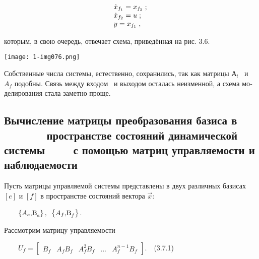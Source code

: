 \documentclass[a4paper]{article}
\newcommand\boldsubformula[1]{\text{\mathversion{bold}$#1$}}
\begin{document}
\begin{equation*}
\begin{matrix}\dot x_{f_1}=x_{f_2}\;;\hfill\null \\\dot x_{f_2}=u\;;\hfill\null \\y=x_{f_1}\;,\hfill\null
\end{matrix}\hfill 
\end{equation*}
{\begin{russian}\sffamily
которым, в свою очередь, отвечает схема, приведённая на рис. 3.6.
\end{russian}}


\bigskip

{\centering  \texttt{[image: 1-img076.png]} \par}
{\begin{russian}\sffamily
Собственные числа системы, естественно, сохранились, так как матрицы $А_l$ \ и  $A_f$ подобны. Связь между входом \ и
выходом осталась неизменной, а схема моделирования стала заметно проще. 
\end{russian}}

\subsection[Вычисление матрицы преобразования базиса в \ \ \ \ \ \ \ пространстве состояний динамической системы
\ \ \ \ с помощью матриц управляемости и наблюдаемости]{Вычисление матрицы преобразования базиса в
\ \ \ \ \ \ \ пространстве состояний динамической системы \ \ \ \ с помощью матриц управляемости и наблюдаемости}
\hypertarget{RefHeadingToc455659737}{}{\begin{russian}\sffamily
Пусть матрицы управляемой системы представлены в двух различных базисах  $[e]$ и  $[f]$ в пространстве состояний вектора
 $\vec x$:
\end{russian}}

{\begin{russian}\sffamily
\ \ \ \  $\left\{A_e\boldsubformula{\text{,B}}_e\right\},\text{   }\left\{A_f\boldsubformula{\text{,B}}_f\right\}$.\ \ 
\end{russian}}

{\begin{russian}\sffamily
Рассмотрим матрицу управляемости
\end{russian}}

{\begin{russian}\sffamily
\ \ \ \  $U_f=\left[\begin{matrix}B_f&A_fB_f&A_f^2B_f&...&A_f^{n-1}B_f\end{matrix}\right]$.\ \ (3.7.1)
\end{russian}}
\end{document}
